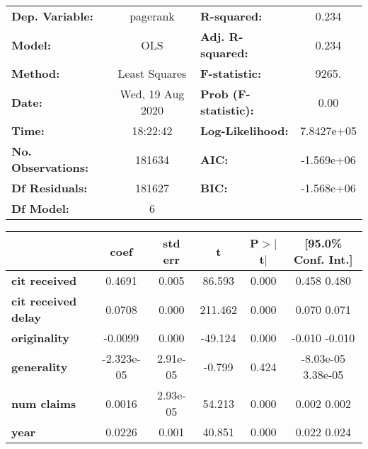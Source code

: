\begin{center}
\begin{tabular}{lclc}
\toprule
\textbf{Dep. Variable:}     &     pagerank     & \textbf{  R-squared:         } &       0.234    \\
\textbf{Model:}             &       OLS        & \textbf{  Adj. R-squared:    } &       0.234    \\
\textbf{Method:}            &  Least Squares   & \textbf{  F-statistic:       } &       9265.    \\
\textbf{Date:}              & Wed, 19 Aug 2020 & \textbf{  Prob (F-statistic):} &       0.00     \\
\textbf{Time:}              &     18:22:42     & \textbf{  Log-Likelihood:    } &   7.8427e+05   \\
\textbf{No. Observations:}  &      181634      & \textbf{  AIC:               } &   -1.569e+06   \\
\textbf{Df Residuals:}      &      181627      & \textbf{  BIC:               } &   -1.568e+06   \\
\textbf{Df Model:}          &           6      & \textbf{                     } &                \\
\bottomrule
\end{tabular}
\begin{tabular}{lccccc}
                            & \textbf{coef} & \textbf{std err} & \textbf{t} & \textbf{P$>$$|$t$|$} & \textbf{[95.0\% Conf. Int.]}  \\
\midrule
\textbf{cit received}       &       0.4691  &        0.005     &    86.593  &         0.000        &         0.458     0.480       \\
\textbf{cit received delay} &       0.0708  &        0.000     &   211.462  &         0.000        &         0.070     0.071       \\
\textbf{originality}        &      -0.0099  &        0.000     &   -49.124  &         0.000        &        -0.010    -0.010       \\
\textbf{generality}         &   -2.323e-05  &     2.91e-05     &    -0.799  &         0.424        &     -8.03e-05  3.38e-05       \\
\textbf{num claims}         &       0.0016  &     2.93e-05     &    54.213  &         0.000        &         0.002     0.002       \\
\textbf{year}               &       0.0226  &        0.001     &    40.851  &         0.000        &         0.022     0.024       \\

\end{tabular}
\end{center}
